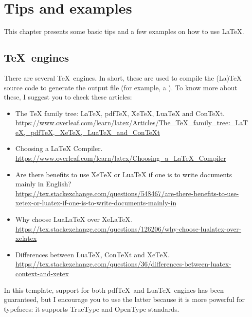 \chapter{Tips and examples}
\label{c2}

This chapter presents some basic tips and a few examples on how to use \LaTeX.


\section{\TeX\ engines}
\label{c2:s:tex-engines}

There are several \TeX\ engines.
In short, these are used to compile the (La)TeX source code to generate the output file (for example, a ).
To know more about these, I suggest you to check these articles:

\begin{itemize}
\item
The TeX family tree: LaTeX, pdfTeX, XeTeX, LuaTeX and ConTeXt.\\
\url{https://www.overleaf.com/learn/latex/Articles/The_TeX_family_tree:_LaTeX,_pdfTeX,_XeTeX,_LuaTeX_and_ConTeXt}

\item
Choosing a LaTeX Compiler.\\
\url{https://www.overleaf.com/learn/latex/Choosing_a_LaTeX_Compiler}

\item
Are there benefits to use XeTeX or LuaTeX if one is to write documents mainly in English?\\
\url{https://tex.stackexchange.com/questions/548467/are-there-benefits-to-use-xetex-or-luatex-if-one-is-to-write-documents-mainly-in}

\item
Why choose LuaLaTeX over XeLaTeX.\\
\url{https://tex.stackexchange.com/questions/126206/why-choose-lualatex-over-xelatex}

\item
Differences between LuaTeX, ConTeXt and XeTeX.\\
\url{https://tex.stackexchange.com/questions/36/differences-between-luatex-context-and-xetex}

\end{itemize}

In this template, support for both pdf\TeX\ and Lua\TeX\ engines has been guaranteed, but I encourage you to use the latter because it is more powerful for typefaces: it supports TrueType and OpenType standards.


